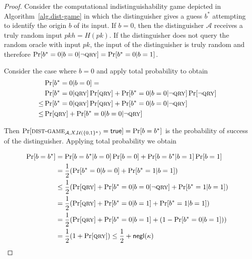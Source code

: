\begin{proof}
  Consider the computational
  indistinguishability game depicted in
  Algorithm~\ref{alg.dist-game} in which the distinguisher gives a guess $b^*$
  attempting to identify the origin $b$ of its input.
  If $b = 0$, then the distinguisher $\mathcal{A}$ receives a truly random input
  $pkh = H(pk)$.
  If the distinguisher does not query the random oracle
  with input $pk$, the input of the distinguisher is truly random
  and therefore $\Pr[b^* = 0|b = 0|\lnot \textsc{qry}] = \Pr[b^* = 0|b = 1]$.

  Consider the case where $b = 0$ and apply total probability to obtain
  \begin{align*}
    &\Pr[b^* = 0|b = 0] =\\
    &\Pr[b^* = 0|\textsc{qry}]\Pr[\textsc{qry}] +
      \Pr[b^* = 0|b = 0|\lnot \textsc{qry}]\Pr[\lnot \textsc{qry}]\\
    \leq &\Pr[b^* = 0|\textsc{qry}]\Pr[\textsc{qry}] +
      \Pr[b^* = 0|b = 0|\lnot \textsc{qry}]\\
    \leq &\Pr[\textsc{qry}] + \Pr[b^* = 0|b = 0|\lnot \textsc{qry}]
  \end{align*}

  Then
  $
    \Pr[\textsc{dist}\-\text{-}\-\textsc{game}_{\mathcal{A},X,\mathcal{U}(\{0,1\}^\kappa)} = \mathsf{true}]
    =
    \Pr[b = b^*]
  $ is the probability of success of the distinguisher.
  Applying total probability we obtain

  \begin{align*}
    \Pr[b = b^*] &= \Pr[b = b^*|b = 0]\Pr[b = 0] + \Pr[b = b^*|b = 1]\Pr[b = 1]\\
                 &= \frac{1}{2}(\Pr[b^* = 0|b = 0] + \Pr[b^* = 1|b = 1])\\
                 &\leq \frac{1}{2}(\Pr[\textsc{qry}] + \Pr[b^* = 0|b = 0|\lnot \textsc{qry}]
                 + \Pr[b^* = 1|b = 1])\\
                 &= \frac{1}{2}(\Pr[\textsc{qry}] + \Pr[b^* = 0|b = 1]
                 + \Pr[b^* = 1|b = 1])\\
                 &= \frac{1}{2}(\Pr[\textsc{qry}] + \Pr[b^* = 0|b = 1]
                 + (1 - \Pr[b^* = 0|b = 1]))\\
                 &= \frac{1}{2}(1 + \Pr[\textsc{qry}]) \leq \frac{1}{2} + \textsf{negl}(\kappa)
  \end{align*}
\end{proof}

